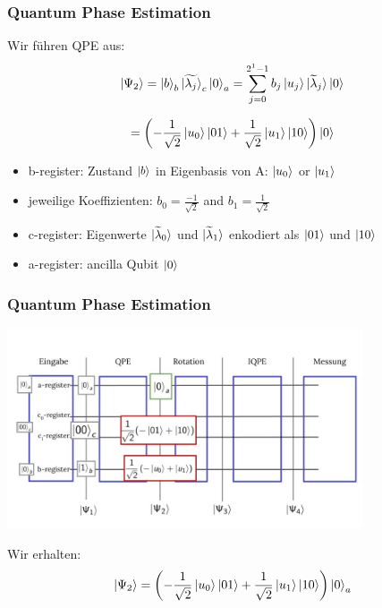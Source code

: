 \begin{frame}
    \frametitle{Quantum Phase Estimation}
    
    Wir führen QPE aus:
    $$\ket{\Psi_2} = \ket{b}_b \ket{\widetilde{\lambda_j}}_c\ket{0}_a
     =\sum_{j=0}^{2^{1}-1} b_j \ket{u_j} \ket{ \widetilde{\lambda}_j} \ket{0}$$

    $$=\left(-\frac{1}{\sqrt{2}} \ket{u_0} \ket{01} +\frac{1}{\sqrt{2}}  
    \ket{u_1} \ket{10} \right)  \ket{0}$$

    \hfil

    \hfil

    \begin{itemize}
    \item b-register: Zustand $\ket{b}$ in Eigenbasis von A: $ \ket{u_0}$ or $\ket{u_1}$
    \item jeweilige Koeffizienten: $b_0 =\frac{-1}{\sqrt{2}}$ and  $b_1 =\frac{1}{\sqrt{2}}$
    \item c-register: Eigenwerte $\ket{\widetilde{\lambda}_0}$ und $\ket{\widetilde{\lambda}_1}$ enkodiert als  $\ket{01}$ und $\ket{10}$
    \item a-register: ancilla Qubit $\ket{0}$ 
    \end{itemize}
\end{frame}

\begin{frame}
    \frametitle{Quantum Phase Estimation}
    \begin{center}
    \includegraphics[width=10.5cm]{img/example_circuit/example_circuit_2.jpg}
    \end{center}

    Wir erhalten:
    $$\ket{\Psi_2} =\left(-\frac{1}{\sqrt{2}} \ket{u_0} \ket{01} +\frac{1}{\sqrt{2}}  
    \ket{u_1} \ket{10} \right)  \ket{0}_a$$

\end{frame}

